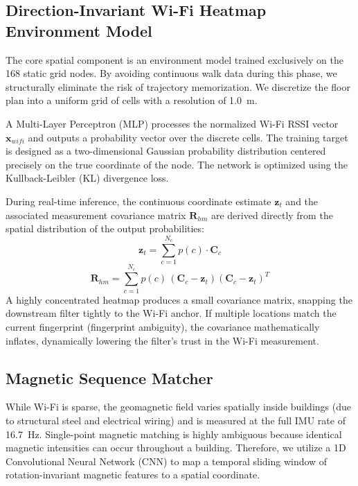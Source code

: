 \documentclass[conference]{IEEEtran}
\begin{document}
\subsection{Direction-Invariant Wi-Fi Heatmap Environment Model}

The core spatial component is an environment model trained exclusively on the 168 static grid nodes. By avoiding continuous walk data during this phase, we structurally eliminate the risk of trajectory memorization. We discretize the floor plan into a uniform grid of cells with a resolution of 1.0~m. 

A Multi-Layer Perceptron (MLP) processes the normalized Wi-Fi RSSI vector $\mathbf{x}_{wifi}$ and outputs a probability vector over the discrete cells. The training target is designed as a two-dimensional Gaussian probability distribution centered precisely on the true coordinate of the node. The network is optimized using the Kullback-Leibler (KL) divergence loss.

During real-time inference, the continuous coordinate estimate $\mathbf{z}_t$ and the associated measurement covariance matrix $\mathbf{R}_{hm}$ are derived directly from the spatial distribution of the output probabilities:
\begin{equation}
\mathbf{z}_t = \sum_{c=1}^{N_c} p(c) \cdot \mathbf{C}_c \label{eq:heatmap_centroid}
\end{equation}
\begin{equation}
\mathbf{R}_{hm} = \sum_{c=1}^{N_c} p(c)\,(\mathbf{C}_c - \mathbf{z}_t)(\mathbf{C}_c - \mathbf{z}_t)^T \label{eq:heatmap_cov}
\end{equation}
A highly concentrated heatmap produces a small covariance matrix, snapping the downstream filter tightly to the Wi-Fi anchor. If multiple locations match the current fingerprint (fingerprint ambiguity), the covariance mathematically inflates, dynamically lowering the filter's trust in the Wi-Fi measurement.

\subsection{Magnetic Sequence Matcher}

While Wi-Fi is sparse, the geomagnetic field varies spatially inside buildings (due to structural steel and electrical wiring) and is measured at the full IMU rate of 16.7~Hz. Single-point magnetic matching is highly ambiguous because identical magnetic intensities can occur throughout a building. Therefore, we utilize a 1D Convolutional Neural Network (CNN) to map a temporal sliding window of rotation-invariant magnetic features to a spatial coordinate.
\end{document}

